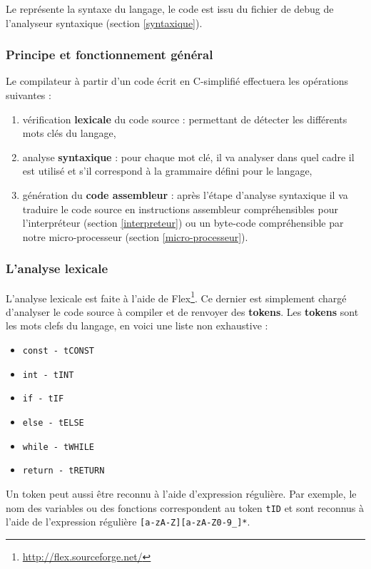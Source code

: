 Le  représente la syntaxe du langage, le code est issu du fichier de debug de l'analyseur syntaxique (section \ref{syntaxique}).

    \subsubsection{Principe et fonctionnement général}
Le compilateur à partir d'un code écrit en C-simplifié effectuera les opérations suivantes :
\begin{enumerate}
\item vérification \textbf{lexicale} du code source : permettant de détecter les différents mots clés du langage,
\item analyse \textbf{syntaxique} : pour chaque mot clé, il va analyser dans quel cadre il est utilisé et s'il correspond à la grammaire défini pour le langage,
\item génération du \textbf{code assembleur} : après l'étape d'analyse syntaxique il va traduire le code source en instructions assembleur compréhensibles pour l'interpréteur (section \ref{interpreteur}) ou un byte-code compréhensible par notre micro-processeur (section \ref{micro-processeur}).
\end{enumerate}


    \subsubsection{L'analyse lexicale}
    
    L'analyse lexicale est faite à l'aide de Flex\footnote{\url{http://flex.sourceforge.net/}}. Ce dernier est simplement chargé d'analyser le code source à compiler et de renvoyer des \textbf{tokens}. Les \textbf{tokens} sont les mots clefs du langage, en voici une liste non exhaustive :
    
    \begin{itemize}
    \item \texttt{const - tCONST}
    \item \texttt{int - tINT}
    \item \texttt{if - tIF}
    \item \texttt{else - tELSE}
    \item \texttt{while - tWHILE}
    \item \texttt{return - tRETURN}
    \end{itemize}
    
    Un token peut aussi être reconnu à l'aide d'expression régulière. Par exemple, le nom des variables ou des fonctions correspondent au token \texttt{tID} et sont reconnus à l'aide de l'expression régulière \texttt{[a-zA-Z][a-zA-Z0-9\_]*}. 
    
